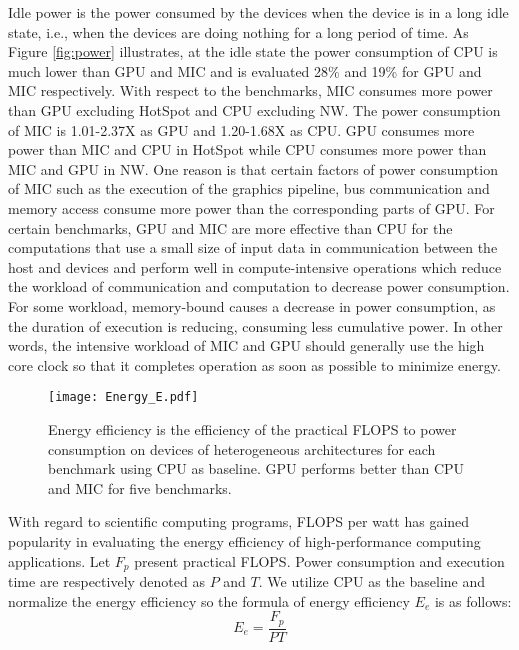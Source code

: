  Idle power is the power consumed by the devices when the device is in a long idle state, i.e., when the devices are doing nothing for a long period of time. As Figure \ref{fig:power} illustrates, at the idle state the power consumption of CPU is much lower than GPU and MIC and is evaluated 28\% and 19\% for GPU and MIC respectively. With respect to the benchmarks, MIC consumes more power than GPU excluding HotSpot and CPU excluding NW. The power consumption of MIC is 1.01-2.37X as GPU and 1.20-1.68X as CPU. GPU consumes more power than MIC and CPU in HotSpot while CPU consumes more power than MIC and GPU in NW. One reason is that certain factors of power consumption of MIC such as the execution of the graphics pipeline, bus communication and memory access consume more power than the corresponding parts of GPU. For certain benchmarks, GPU and MIC are more effective than CPU for the computations that use a small size of input data in communication between the host and devices and perform well in compute-intensive operations which reduce the workload of communication and computation to decrease power consumption. For some workload, memory-bound causes a decrease in power consumption, as the duration of execution is reducing, consuming less cumulative power. In other words, the intensive workload of MIC and GPU should generally use the high core clock so that it completes operation as soon as possible to minimize energy. 


    \begin{figure}[h!]
  \centering
  \begin{minipage}{0.5\textwidth}
    \centering
   \centering
     \texttt{[image: Energy\_E.pdf]}    
\caption{Energy efficiency is the efficiency of the practical FLOPS to power consumption on devices of heterogeneous architectures for each benchmark using CPU as baseline. GPU performs better than CPU and MIC for five benchmarks.} 
\label{fig:energyE}
\end{minipage}%
\end{figure}


With regard to scientific computing programs, FLOPS per watt has gained popularity in evaluating the energy efficiency of high-performance computing applications. Let $F_{p}$ present practical FLOPS. Power consumption and execution time are respectively denoted as $P$ and $T$. We utilize CPU as the baseline and normalize the energy efficiency so the formula of energy efficiency $E_{e}$ is as follows:
\begin{equation}\label{equ:energyE}
  {E_{e}} = \frac{F_{p}}{PT}
\end{equation}
  

